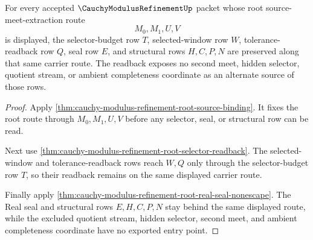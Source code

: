 \begin{theorem}
\label{thm:cauchy-modulus-refinement-paper-lean-readback-sync}
For every accepted $\CauchyModulusRefinementUp$ packet whose root source-meet-extraction route
$$
M_0,M_1,U,V
$$
is displayed, the selector-budget row $T$, selected-window row $W$, tolerance-readback row $Q$, seal row $E$, and structural rows $H,C,P,N$ are preserved along that same carrier route. The readback exposes no second meet, hidden selector, quotient stream, or ambient completeness coordinate as an alternate source of those rows.
\end{theorem}
\begin{proof}
Apply \autoref{thm:cauchy-modulus-refinement-root-source-binding}. It fixes the root route through $M_0,M_1,U,V$ before any selector, seal, or structural row can be read.

Next use \autoref{thm:cauchy-modulus-refinement-root-selector-readback}. The selected-window and tolerance-readback rows reach $W,Q$ only through the selector-budget row $T$, so their readback remains on the same displayed carrier route.

Finally apply \autoref{thm:cauchy-modulus-refinement-root-real-seal-nonescape}. The Real seal and structural rows $E,H,C,P,N$ stay behind the same displayed route, while the excluded quotient stream, hidden selector, second meet, and ambient completeness coordinate have no exported entry point.
\end{proof}

